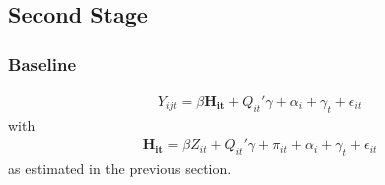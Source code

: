 \documentclass{article}
\begin{document}
\subsection{Second Stage}
\subsubsection{Baseline}

\begin{align}
Y_{ijt} =  \beta \mathbf{H_{it}} +  Q_{it}'\gamma + \alpha_i + \gamma_t + \epsilon_{it}
\end{align}
with 
\begin{align}
\mathbf{H_{it}} =  \beta Z_{it} +  Q_{it}'\gamma + \pi_{it} + \alpha_i + \gamma_t + \epsilon_{it}
\end{align}
as estimated in the previous section.
\end{document}
